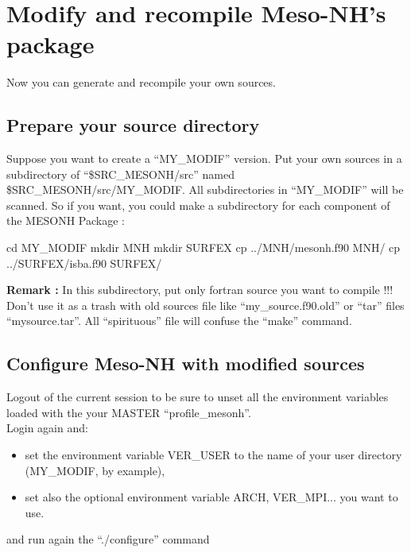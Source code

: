 \section{Modify and recompile Meso-NH's package}

Now you can generate and recompile your own sources. 


\subsection{Prepare your source directory}

Suppose you want to create a ``MY\_MODIF'' version. Put your own sources in a subdirectory of ``\${SRC\_MESONH}/src'' named  \${SRC\_MESONH}/src/MY\_MODIF. All subdirectories in ``MY\_MODIF'' will be scanned. So if you want, you could make a subdirectory for each component of the MESONH Package :
\begin{bashcode}
cd MY_MODIF
mkdir MNH
mkdir SURFEX
cp ../MNH/mesonh.f90 MNH/
cp ../SURFEX/isba.f90 SURFEX/
\end{bashcode}

\textbf{Remark :} In this subdirectory, put only fortran source you want to compile !!! Don't use it as a trash with old sources file like ``my\_source.f90.old'' or ``tar'' files ``mysource.tar''. All ``spirituous'' file will confuse the ``make'' command.
 
\subsection{Configure Meso-NH with modified sources}
 
Logout of the current session to be sure to unset all the environment variables loaded with the your MASTER ``profile\_mesonh''. \\

Login again and:
\begin{itemize}
\item set the environment variable VER\_USER to the name of your user directory (MY\_MODIF, by example), 
\item set also the optional environment variable ARCH, VER\_MPI... you want to use.
\end{itemize}

and run again the ``./configure'' command

